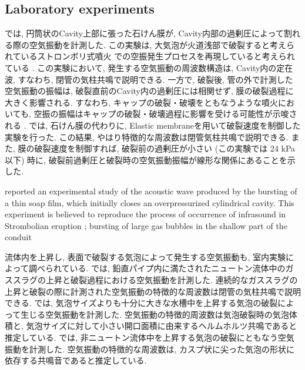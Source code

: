 \documentclass[12pt]{article}
\begin{document}
\subsection{Laboratory experiments}\label{AcoinEx}
\cite{Vidal2006a}では, 円筒状のCavity上部に張った石けん膜が, Cavity内部の過剰圧によって割れる際の空気振動を計測した. 
この実験は, 大気泡が火道浅部で破裂すると考えられているストロンボリ式噴火 \citep{Chouet1974, BLACKBURN1976, Vergniolle1996c}での空振発生プロセスを再現していると考えられている \citep{Vidal2010a, Gerst2013a}.
この実験において, 発生する空気振動の周波数構造は, Cavity内の定在波, すなわち, 閉管の気柱共鳴で説明できる. 一方で, 破裂後, 管の外で計測した空気振動の振幅は, 破裂直前のCavity内の過剰圧には相関せず, 膜の破裂過程に大きく影響される. すなわち, キャップの破裂・破壊をともなうような噴火においても, 空振の振幅はキャップの破裂・破壊過程に影響を受ける可能性が示唆される \citep{Vidal2010a}. \cite{Sanchez2014}では, 石けん膜の代わりに, Elastic membraneを用いて破裂速度を制御した実験を行った. この結果, やはり特徴的な周波数は閉管気柱共鳴で説明できる. また, 膜の破裂速度を制御すれば, 破裂前の過剰圧が小さい (この実験では 24 kPa以下) 時に, 破裂前過剰圧と破裂時の空気振動振幅が線形な関係にあることを示した. 


\cite{Vidal2006a} reported an experimental study of the acoustic wave produced by the bursting of a thin soap film, which initially closes an overpressurized cylindrical cavity.
This experiment is believed to reproduce the process of occurrence of infrasound in Strombolian eruption \citep {Chouet1974, BLACKBURN1976, Vergniolle1996c}; bursting of large gas bubbles in the shallow part of the conduit  \citep{Vidal2010a, Gerst2013a}


流体内を上昇し, 表面で破裂する気泡によって発生する空気振動も, 室内実験によって調べられている.
\cite{James2004}では, 鉛直パイプ内に満たされたニュートン流体中のガススラグの上昇と破裂過程における空気振動を計測した. 連続的なガススラグの上昇と破裂の際に計測された空気振動の特徴的な周波数は閉管の気柱共鳴で説明できる. 
\cite{Spiel1992}では, 気泡サイズよりも十分に大きな水槽中を上昇する気泡の破裂によって生じる空気振動を計測した. 空気振動の特徴的周波数は気泡破裂時の気泡体積と, 気泡サイズに対して小さい開口面積に由来するヘルムホルツ共鳴であると推定している.
\cite{Divoux2008}では, 非ニュートン流体中を上昇する気泡の破裂にともなう空気振動を計測した. 空気振動の特徴的な周波数は, カスプ状に尖った気泡の形状に依存する共鳴音であると推定している.
\end{document}
